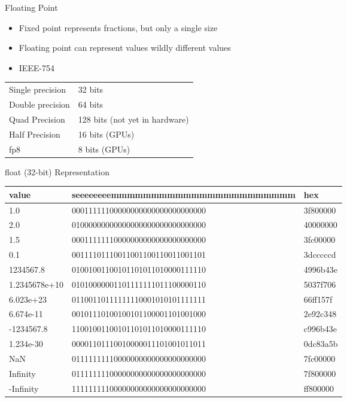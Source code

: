 \begin{withoutheadline}
\begin{frame}[fragile]{Floating Point}
\begin{itemize}
    \item Fixed point represents fractions, but only a single size
    \item Floating point can represent values wildly different values
    \item IEEE-754
\end{itemize}
\begin{tabular}{p{4cm}|p{5cm}} \toprule
Single precision & 32 bits \\
Double precision & 64 bits \\
Quad Precision   & 128 bits (not yet in hardware) \\
Half Precision   & 16 bits  (GPUs) \\
fp8              & 8 bits  (GPUs)  \\ \bottomrule
\end{tabular}
\end{frame}

\begin{frame}[fragile]{float (32-bit) Representation}
\setlength{\tabcolsep}{2pt}
\scriptsize
\ttfamily
\begin{tabular}{p{2cm}|p{5cm}|p{1.5cm}} \toprule
value         & seeeeeeeemmmmmmmmmmmmmmmmmmmmmmm &      hex \\ \midrule
1.0           & 00011111100000000000000000000000 & 3f800000 \\
2.0           & 01000000000000000000000000000000 & 40000000 \\
1.5           & 00011111110000000000000000000000 & 3fc00000 \\
0.1           & 00111101110011001100110011001101 & 3dcccccd \\
1234567.8     & 01001001100101101011010000111110 & 4996b43e \\
1.2345678e+10 & 01010000001101111111011100000110 & 5037f706 \\
6.023e+23     & 01100110111111110001010101111111 & 66ff157f \\
6.674e-11     & 00101110100100101100001101001000 & 2e92c348 \\
-1234567.8    & 11001001100101101011010000111110 & c996b43e \\
1.234e-30     & 00001101110010000011101001011011 & 0dc83a5b \\
NaN           & 01111111110000000000000000000000 & 7fc00000 \\
Infinity      & 01111111100000000000000000000000 & 7f800000 \\
-Infinity     & 11111111100000000000000000000000 & ff800000 \\ \bottomrule
\end{tabular}
\end{frame}


\end{withoutheadline}
